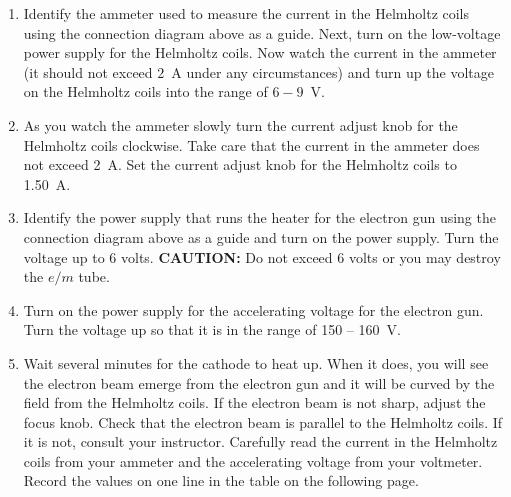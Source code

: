 \begin{enumerate}[labparts]
\item Identify the ammeter used to measure the current in the Helmholtz
coils using the connection diagram above as a guide. 
Next, turn on the low-voltage power supply for the Helmholtz coils.
Now watch the current in the ammeter (it should not exceed $2$~A under
any circumstances) and
turn up the voltage on the Helmholtz coils into the range of $6-9$~V.

\item As you watch the ammeter slowly turn the current adjust knob for the 
Helmholtz coils clockwise. Take care that
the current in the ammeter does not exceed 2~A.
Set the current adjust knob for the Helmholtz coils to 1.50~A.

\item Identify the power supply that runs the heater for the electron gun using 
the connection diagram above as a guide and turn on the power supply. Turn the voltage up to 
6 volts. {\bf CAUTION:} Do not exceed 6 volts or you may destroy the $e/m$
tube.

\item Turn on the power supply for the accelerating voltage for the electron gun.
Turn the voltage up so that it is in the range of 150 -- 160~V.

\item Wait several minutes for the cathode to heat up. When
it does, you will see the electron beam emerge from
the electron gun and it will be curved by the field from
the Helmholtz coils. If the electron beam is not sharp, adjust the focus knob. 
Check that the electron beam is
parallel to the Helmholtz coils. If it is not, consult your instructor.
 Carefully read the current in the Helmholtz coils from
your ammeter and the accelerating voltage from your
voltmeter. Record the values on one line in the table on the following page.
\label{eoverm_B1.5amps}

\begin{minipage}{0.55\textwidth}


\end{minipage}
\end{enumerate}
